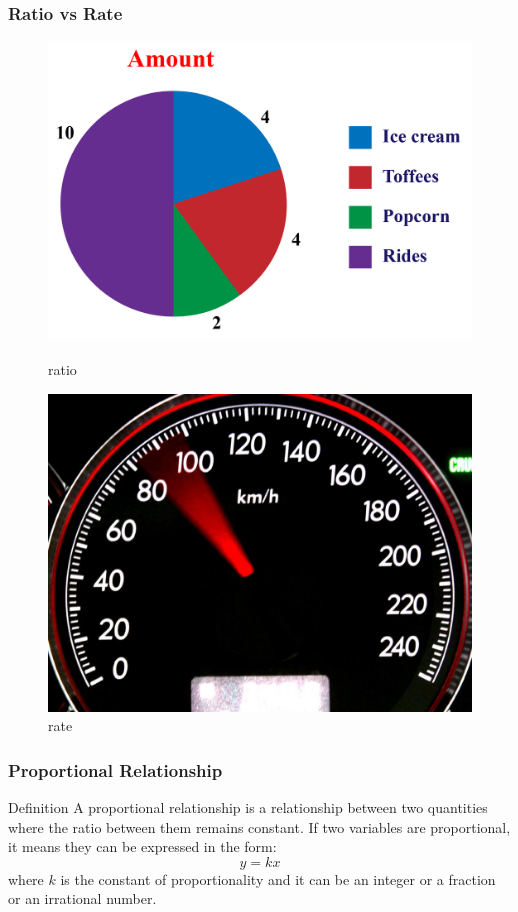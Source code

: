 \documentclass{beamer}
\begin{document}
\begin{frame}
    \frametitle{Ratio vs Rate}
    \begin{figure}[h]    
        \begin{minipage}[b]{0.5\textwidth}
        \centering
        \includegraphics[scale=0.2]{ratio.png}
        \caption{ratio}
    \end{minipage}
    \begin{minipage}[b]{0.4\textwidth}
        \centering
        \includegraphics[scale=0.5]{rate.jpeg}
        \caption{rate}
    \end{minipage}
\end{figure}
\end{frame}
\begin{frame}
    \frametitle{Proportional Relationship}

    \begin{block}{Definition}
        A proportional relationship is a relationship between two quantities where the ratio between them remains constant. 
        If two variables are proportional, it means they can be expressed in the form:
        \[ y = kx \]
        where $ k $ is the constant of proportionality and it can be an integer or a fraction or an irrational number.
    \end{block}
\end{frame}
\end{document}
